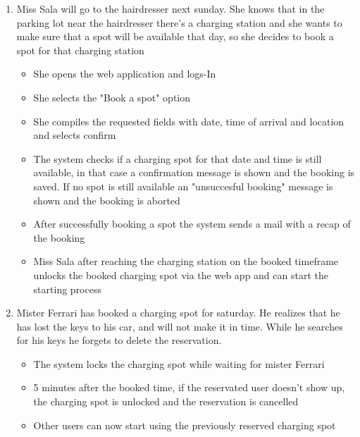 \documentclass[table, 12pt]{article} %
\begin{document}
\begin{enumerate}
\begin{itemize}
            \end{itemize}
            
            \item Miss Sala will go to the hairdresser next sunday. She knows that in the parking lot near the hairdresser there's a charging station and she wants to make sure that a spot will be available that day, so she decides to book a spot for that charging station
            \begin{itemize}
                \item She opens the web application and logs-In
                \item She selects the "Book a spot" option
                \item She compiles the requested fields with date, time of arrival and location and selects confirm
                \item The system checks if a charging spot for that date and time is still available, in that case a confirmation message is shown and the booking is saved. If no spot is still available an "unsuccesful booking" message is shown and the booking is aborted
                \item After successfully booking a spot the system sends a mail with a recap of the booking 
                \item Miss Sala after reaching the charging station on the booked timeframe unlocks the booked charging spot via the web app and can start the starting process
            \end{itemize}
            
            \item Mister Ferrari has booked a charging spot for saturday. He realizes that he has lost the keys to his car, and will not make it in time. While he searches for his keys he forgets to delete the reservation.
            \begin{itemize}
                \item The system locks the charging spot while waiting for mister Ferrari
                \item 5 minutes after the booked time, if the reservated user doesn't show up, the charging spot is unlocked and the reservation is cancelled
                \item Other users can now start using the previously reserved charging spot
            \end{itemize}


\end{enumerate}
\end{document}
